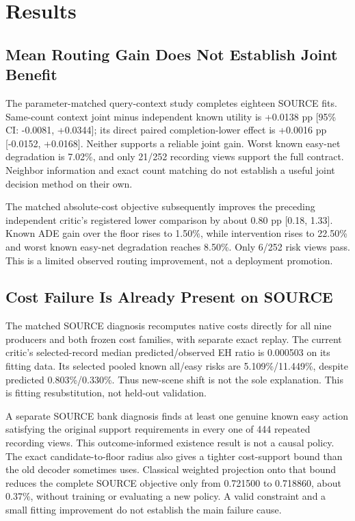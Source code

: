 \documentclass[10pt,twocolumn,letterpaper]{article}
\begin{document}
\section{Results}
\subsection{Mean Routing Gain Does Not Establish Joint Benefit}
The parameter-matched query-context study completes eighteen SOURCE fits.
Same-count context joint minus independent known utility is +0.0138 pp
[95\% CI: -0.0081, +0.0344]; its direct paired completion-lower effect is +0.0016 pp
[-0.0152, +0.0168]. Neither supports a reliable joint gain. Worst known easy-net
degradation is 7.02\%, and only 21/252 recording views support the full contract.
Neighbor information and exact count matching do not establish a useful joint
decision method on their own.

The matched absolute-cost objective subsequently improves the preceding
independent critic's registered lower comparison by about 0.80 pp [0.18, 1.33].
Known ADE gain over the floor rises to 1.50\%, while intervention rises to 22.50\%
and worst known easy-net degradation reaches 8.50\%. Only 6/252 risk views pass.
This is a limited observed routing improvement, not a deployment promotion.

\subsection{Cost Failure Is Already Present on SOURCE}
The matched SOURCE diagnosis recomputes native costs directly for all nine
producers and both frozen cost families, with separate exact replay. The
current critic's selected-record median predicted/observed EH ratio is 0.000503
on its fitting data. Its selected pooled known all/easy risks are 5.109\%/11.449\%,
despite predicted 0.803\%/0.330\%. Thus new-scene shift is not the sole explanation.
This is fitting resubstitution, not held-out validation.

A separate SOURCE bank diagnosis finds at least one genuine known easy action
satisfying the original support requirements in every one of 444 repeated
recording views. This outcome-informed existence result is not a causal policy.
The exact candidate-to-floor radius also gives a tighter cost-support bound
than the old decoder sometimes uses. Classical weighted projection onto that
bound reduces the complete SOURCE objective only from 0.721500 to 0.718860,
about 0.37\%, without training or evaluating a new policy. A valid constraint
and a small fitting improvement do not establish the main failure cause.
\end{document}
